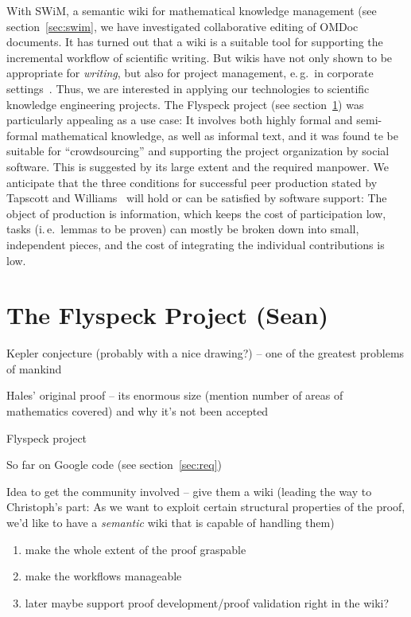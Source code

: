 \documentclass{llncs}
\begin{document}
With SWiM, a semantic wiki for mathematical knowledge management (see
section~\ref{sec:swim}, we have investigated collaborative editing of OMDoc documents.  It
has turned out that a wiki is a suitable tool for supporting the incremental workflow of
scientific writing.  But wikis have not only shown to be appropriate for \emph{writing},
but also for project management, e.\,g.\ in corporate settings~\cite{leuf01:wikiway}.
Thus, we are interested in applying our technologies to scientific knowledge engineering
projects.  The Flyspeck project (see section~\ref{sec:flyspeck}) was particularly
appealing as a use case: It involves both highly formal and semi-formal mathematical
knowledge, as well as informal text, and it was found te be suitable for ``crowdsourcing''
and supporting the project organization by social software.  This is suggested by its
large extent and the required manpower.  We anticipate that the three conditions for
successful peer production stated by Tapscott and Williams~\cite{wikinomics} will hold or
can be satisfied by software support: The object of production is information, which keeps
the cost of participation low, tasks (i.\,e.\ lemmas to be proven) can mostly be broken
down into small, independent pieces, and the cost of integrating the individual
contributions is low.

\section{The Flyspeck Project (Sean)}
\label{sec:flyspeck}

Kepler conjecture (probably with a nice drawing?) -- one of the greatest problems of
mankind

Hales' original proof -- its enormous size (mention number of areas of mathematics
covered) and why it's not been accepted

Flyspeck project\cite{hales:DSP:2006:432}

So far on Google code (see section~\ref{sec:req})

Idea to get the community involved -- give them a wiki (leading the way to Christoph's
part: As we want to exploit certain structural properties of the proof, we'd like to have
a \emph{semantic} wiki that is capable of handling them)

\begin{enumerate}
\item make the whole extent of the proof graspable
\item make the workflows manageable
\item later maybe support proof development/proof validation right in the
  wiki?
\end{enumerate}
\end{document}
